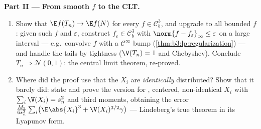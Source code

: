 \begin{problem}
\medskip
\noindent\textbf{Part II --- From smooth $f$ to the CLT.}
\begin{enumerate}[resume]
  \item Show that $\E f(T_n) \to \E f(N)$ for every $f \in
        \mathcal C_b^3$, and upgrade to all bounded
         $f$: given such $f$ and $\varepsilon$,
        construct $f_\varepsilon \in \mathcal C^3_b$ with
        $\norm{f - f_\varepsilon}_\infty \leq \varepsilon$
        on a large interval --- e.g.\ convolve $f$ with a
        $\mathcal C^\infty$ bump
        (\cref{thm:b3:lp:regularization}) --- and handle the
        tails by tightness ($\V(T_n) = 1$ and Chebyshev).
        Conclude $T_n \Rightarrow \mathcal N(0, 1)$: the
        central limit theorem, re-proved.
  \item Where did the proof use that the $X_i$ are
        \emph{identically} distributed? Show that it barely
        did: state and prove the version for ,
        centered, non-identical $X_i$ with
        $\sum_i\V(X_i) = s_n^2$ and third moments, obtaining
        the error $\frac{M_3}{6s_n^3}\sum_i\bigl(\E\abs{X_i}^3
        + \V(X_i)^{3/2}\gamma\bigr)$ --- Lindeberg's true
        theorem in its Lyapunov form.
\end{enumerate}


\end{problem}
